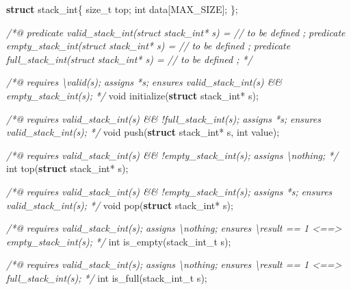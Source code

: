 \documentclass[12pt,francais,]{scrbook}
\newenvironment{Shaded}{}{}
\newcommand{\KeywordTok}[1]{\textcolor[rgb]{0.00,0.44,0.13}{\textbf{{#1}}}}
\newcommand{\DataTypeTok}[1]{\textcolor[rgb]{0.56,0.13,0.00}{{#1}}}
\newcommand{\CommentTok}[1]{\textcolor[rgb]{0.38,0.63,0.69}{\textit{{#1}}}}
\newcommand{\NormalTok}[1]{{#1}}
\begin{document}
\begin{footnotesize}\begin{Shaded}
\begin{Highlighting}[]
\KeywordTok{struct} \NormalTok{stack_int\{}
  \NormalTok{size_t top;}
  \DataTypeTok{int}    \NormalTok{data[MAX_SIZE];}
\NormalTok{\};}

\CommentTok{/*@}
\CommentTok{  predicate valid_stack_int(struct stack_int* s) = // to be defined ;}
\CommentTok{  predicate empty_stack_int(struct stack_int* s) = // to be defined ;}
\CommentTok{  predicate full_stack_int(struct stack_int* s) =  // to be defined ;}
\CommentTok{*/}

\CommentTok{/*@}
\CommentTok{  requires \textbackslash{}valid(s);}
\CommentTok{  assigns *s;}
\CommentTok{  ensures valid_stack_int(s) && empty_stack_int(s);}
\CommentTok{*/}
\DataTypeTok{void} \NormalTok{initialize(}\KeywordTok{struct} \NormalTok{stack_int* s);}

\CommentTok{/*@}
\CommentTok{  requires valid_stack_int(s) && !full_stack_int(s);}
\CommentTok{  assigns  *s;}
\CommentTok{  ensures valid_stack_int(s);}
\CommentTok{*/}
\DataTypeTok{void} \NormalTok{push(}\KeywordTok{struct} \NormalTok{stack_int* s, }\DataTypeTok{int} \NormalTok{value);}

\CommentTok{/*@}
\CommentTok{  requires valid_stack_int(s) && !empty_stack_int(s);}
\CommentTok{  assigns \textbackslash{}nothing;}
\CommentTok{*/}
\DataTypeTok{int}  \NormalTok{top(}\KeywordTok{struct} \NormalTok{stack_int* s);}

\CommentTok{/*@}
\CommentTok{  requires valid_stack_int(s) && !empty_stack_int(s);}
\CommentTok{  assigns *s;}
\CommentTok{  ensures valid_stack_int(s);}
\CommentTok{*/}
\DataTypeTok{void} \NormalTok{pop(}\KeywordTok{struct} \NormalTok{stack_int* s);}

\CommentTok{/*@}
\CommentTok{  requires valid_stack_int(s);}
\CommentTok{  assigns \textbackslash{}nothing;}
\CommentTok{  ensures \textbackslash{}result == 1 <==> empty_stack_int(s);}
\CommentTok{*/}
\DataTypeTok{int}  \NormalTok{is_empty(stack_int_t s);}


\CommentTok{/*@}
\CommentTok{  requires valid_stack_int(s);}
\CommentTok{  assigns \textbackslash{}nothing;}
\CommentTok{  ensures \textbackslash{}result == 1 <==> full_stack_int(s);}
\CommentTok{*/}
\DataTypeTok{int}  \NormalTok{is_full(stack_int_t s);}
\end{Highlighting}
\end{Shaded}\end{footnotesize}
\end{document}
